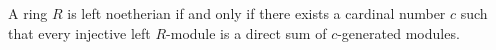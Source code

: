 A ring $R$ is left noetherian if and only if there exists a cardinal number $c$ such that every injective left $R$-module is a direct sum of $c$-generated modules.
